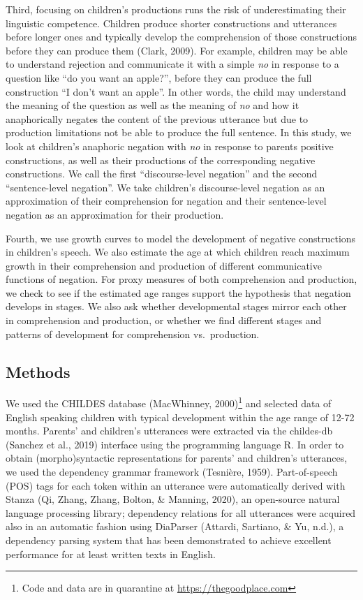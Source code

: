 \documentclass[
  man,floatsintext]{apa6}
\begin{document}
Third, focusing on children's productions runs the risk of underestimating their linguistic competence. Children produce shorter constructions and utterances before longer ones and typically develop the comprehension of those constructions before they can produce them (Clark, 2009). For example, children may be able to understand rejection and communicate it with a simple \emph{no} in response to a question like ``do you want an apple?'', before they can produce the full construction ``I don't want an apple''. In other words, the child may understand the meaning of the question as well as the meaning of \emph{no} and how it anaphorically negates the content of the previous utterance but due to production limitations not be able to produce the full sentence. In this study, we look at children's anaphoric negation with \emph{no} in response to parents positive constructions, as well as their productions of the corresponding negative constructions. We call the first ``discourse-level negation'' and the second ``sentence-level negation''. We take children's discourse-level negation as an approximation of their comprehension for negation and their sentence-level negation as an approximation for their production.

Fourth, we use growth curves to model the development of negative constructions in children's speech. We also estimate the age at which children reach maximum growth in their comprehension and production of different communicative functions of negation. For proxy measures of both comprehension and production, we check to see if the estimated age ranges support the hypothesis that negation develops in stages. We also ask whether developmental stages mirror each other in comprehension and production, or whether we find different stages and patterns of development for comprehension vs.~production.

\hypertarget{methods}{%
\subsection{Methods}\label{methods}}

We used the CHILDES database (MacWhinney, 2000)\footnote{Code and data are in quarantine at \url{https://thegoodplace.com}} and selected data of English speaking children with typical development within the age range of 12-72 months. Parents' and children's utterances were extracted via the childes-db (Sanchez et al., 2019) interface using the programming language R. In order to obtain (morpho)syntactic representations for parents' and children's utterances, we used the dependency grammar framework (Tesnière, 1959). Part-of-speech (POS) tags for each token within an utterance were automatically derived with Stanza (Qi, Zhang, Zhang, Bolton, \& Manning, 2020), an open-source natural language processing library; dependency relations for all utterances were acquired also in an automatic fashion using DiaParser (Attardi, Sartiano, \& Yu, n.d.), a dependency parsing system that has been demonstrated to achieve excellent performance for at least written texts in English.
\end{document}
